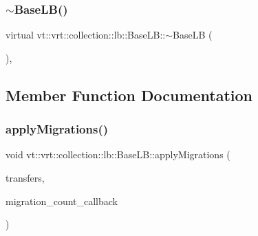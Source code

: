 \subsubsection{\texorpdfstring{$\sim$\+Base\+L\+B()}{~BaseLB()}}
{\footnotesize\ttfamily virtual vt\+::vrt\+::collection\+::lb\+::\+Base\+L\+B\+::$\sim$\+Base\+LB (\begin{DoxyParamCaption}{ }\end{DoxyParamCaption})\hspace{0.3cm}{\ttfamily [virtual]}, {\ttfamily [default]}}



\subsection{Member Function Documentation}
\mbox{\label{structvt_1_1vrt_1_1collection_1_1lb_1_1_base_l_b_aa19210106d6f44ea03b446c7f6a92cb1}} 
\subsubsection{\texorpdfstring{apply\+Migrations()}{applyMigrations()}}
{\footnotesize\ttfamily void vt\+::vrt\+::collection\+::lb\+::\+Base\+L\+B\+::apply\+Migrations (\begin{DoxyParamCaption}\item[{\hyperlink{structvt_1_1vrt_1_1collection_1_1lb_1_1_base_l_b_a329e8179ec41a1bd4924c79fe23a79af}{Transfer\+Vec\+Type} const \&}]{transfers,  }\item[{\hyperlink{structvt_1_1vrt_1_1collection_1_1lb_1_1_base_l_b_aba7198eb30aef1b19c1f1efdea760543}{Migration\+Count\+CB}}]{migration\+\_\+count\+\_\+callback }\end{DoxyParamCaption})}

\mbox{\label{structvt_1_1vrt_1_1collection_1_1lb_1_1_base_l_b_af434b83087858c78365c168fa849055b}} 
